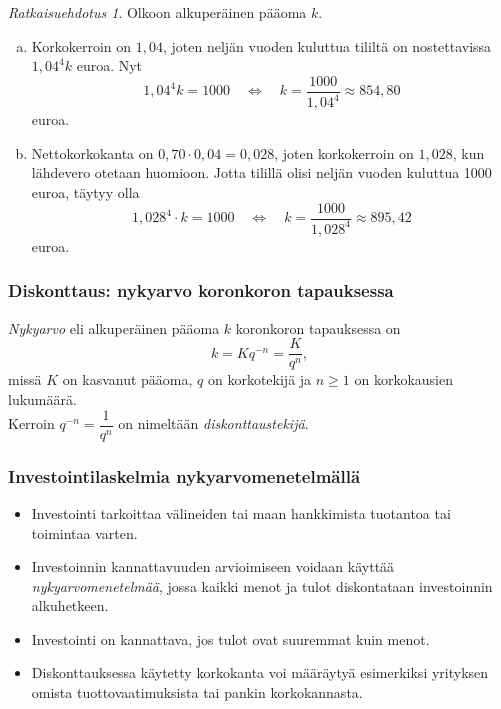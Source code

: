 \documentclass[handout]{beamer}\usepackage[]{graphicx}\usepackage[]{color}
\theoremstyle{remark}
\newtheorem{ratkaisu}{Ratkaisuehdotus}
\newcommand{\pblock}{\\ \vspace{0.5cm}\pause}
\begin{document}
\begin{frame}
    \begin{ratkaisu}
        Olkoon alkuperäinen pääoma \(k\).
        \begin{enumerate}[(a)]
            \item Korkokerroin on \(1,04\), joten neljän vuoden kuluttua tililtä on nostettavissa \(1,04^4k\) euroa. 
            \pause
                Nyt
                \[
                    1,04^4k = 1000\quad\Leftrightarrow\quad k = \frac{1000}{1,04^4}\approx 854,80
                \]
                euroa.
            \item Nettokorkokanta on \(0,70\cdot0,04=0,028\), joten korkokerroin on \(1,028\), kun lähdevero otetaan huomioon. \pause
                Jotta tilillä olisi neljän vuoden kuluttua 1000 euroa, täytyy olla
                \[
                    1,028^4\cdot k = 1000\quad\Leftrightarrow\quad k = \frac{1000}{1,028^4}\approx 895,42
                \]
                euroa.
        \end{enumerate}
    \end{ratkaisu}
\end{frame}

\begin{frame}
    \frametitle{Diskonttaus: nykyarvo koronkoron tapauksessa}
    \pause
    \begin{block}{}
        \emph{Nykyarvo} eli alkuperäinen pääoma $k$ koronkoron tapauksessa on
        \[
            k = Kq^{-n} = \frac{K}{q^n},
        \]
        missä $K$ on kasvanut pääoma, $q$ on korkotekijä ja $n \geq 1$ on korkokausien lukumäärä.
        \pblock
        Kerroin $q^{-n} = \dfrac{1}{q^n}$ on nimeltään \emph{diskonttaustekijä}.
    \end{block}
\end{frame}

\begin{frame}
    \frametitle{Investointilaskelmia nykyarvomenetelmällä}
    \begin{itemize}
        \item {Investointi} tarkoittaa välineiden tai maan hankkimista tuotantoa tai toimintaa varten. \pause
        \item Investoinnin kannattavuuden arvioimiseen voidaan käyttää \emph{nykyarvomenetelmää}, jossa kaikki menot ja tulot diskontataan investoinnin alkuhetkeen.  \pause
        \item Investointi on kannattava, jos tulot ovat suuremmat kuin menot. \pause
        \item Diskonttauksessa käytetty korkokanta voi määräytyä esimerkiksi yrityksen omista tuottovaatimuksista tai pankin korkokannasta.
    \end{itemize}
\end{frame}
\end{document}
